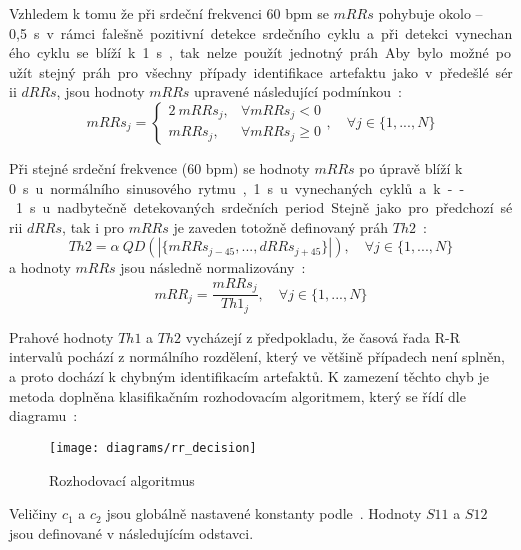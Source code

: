 Vzhledem k tomu že při srdeční frekvenci 60 bpm se $mRRs$ pohybuje okolo
--0,5~\si\s~v rámci falešně pozitivní detekce srdečního cyklu a při detekci
vynechaného cyklu se blíží k 1~\si\s, tak nelze použít jednotný práh. Aby bylo
možné použít stejný práh pro všechny případy identifikace artefaktu jako v
předešlé sérii $dRRs$, jsou hodnoty $mRRs$ upravené následující
podmínkou~\cite{Lipponen2019}:
\begin{equation}
    mRRs_j =
    \begin{cases}
        2~mRRs_j, & \forall mRRs_j < 0    \\
        mRRs_j,   & \forall mRRs_j \geq 0
    \end{cases}
    , \quad \forall j \in \{1,...,N\}
\end{equation}

Při stejné srdeční frekvence (60 bpm) se hodnoty $mRRs$ po úpravě blíží k
0~\si\s~u normálního sinusového rytmu, 1~\si\s~ u vynechaných cyklů a k
--1~\si\s~ u nadbytečně detekovaných srdečních period. Stejně jako pro předchozí
sérii $dRRs$, tak i pro $mRRs$ je zaveden totožně definovaný práh
$Th2$~\cite{Lipponen2019}:
\begin{equation}
    Th2 = \alpha~QD(|\{mRRs_{j-45},...,dRRs_{j+45}\}|), \quad \forall j \in \{1,...,N\}
\end{equation}
a hodnoty $mRRs$ jsou následně normalizovány~\cite{Lipponen2019}:
\begin{equation}
    mRR_j = \frac{mRRs_j}{Th1_j}, \quad \forall j \in \{1,...,N\}
\end{equation}

Prahové hodnoty $Th1$ a $Th2$ vycházejí z předpokladu, že časová řada R-R
intervalů pochází z normálního rozdělení, který ve většině případech není
splněn, a proto dochází k chybným identifikacím artefaktů. K zamezení těchto
chyb je metoda doplněna klasifikačním rozhodovacím algoritmem, který se řídí dle
diagramu~\cite{Lipponen2019}:

\begin{figure}[h]
    \begin{center}
        \texttt{[image: diagrams/rr\_decision]}
        \caption{Rozhodovací algoritmus~\cite{Lipponen2019}}
        \label{fig:rr_decision}
    \end{center}
\end{figure}

Veličiny $c_1$ a $c_2$ jsou globálně nastavené konstanty
podle~\cite{Lipponen2019}. Hodnoty $S11$ a $S12$ jsou definované v následujícím
odstavci.


